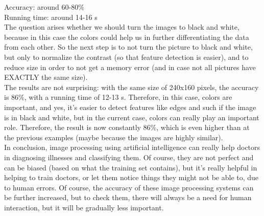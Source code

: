 \documentclass[a4paper,10pt]{article}
\newcommand\tab[1][0.5cm]{\hspace*{#1}}
\begin{document}
    Accuracy: around 60-80\% \\
    \tab Running time: around 14-16 s \\
    
    \tab The question arises whether we should turn the images to black and white, because in this case the colors could help us in further differentiating the data from each other. So the next step is to not turn the picture to black and white, but only to normalize the contrast (so that feature detection is easier), and to reduce size in order to not get a memory error (and in case not all pictures have EXACTLY the same size). \\
    \tab The results are not surprising: with the same size of 240x160 pixels, the accuracy is 86\%, with a running time of 12-13 s. Therefore, in this case, colors are important, and yes, it's easier to detect features like edges and such if the image is in black and white, but in the current case, colors can really play an important role. Therefore, the result is now constantly 86\%, which is even higher than at the previous examples (maybe because the images are highly similar).\\
    \tab In conclusion, image processing using artificial intelligence can really help doctors in diagnosing illnesses and classifying them. Of course, they are not perfect and can be biased (based on what the training set contains), but it's really helpful in helping to train doctors, or let them notice things they might not be able to, due to human errors. Of course, the accuracy of these image processing systems can be further increased, but to check them, there will always be a need for human interaction, but it will be gradually less important.
    
\end{document}
